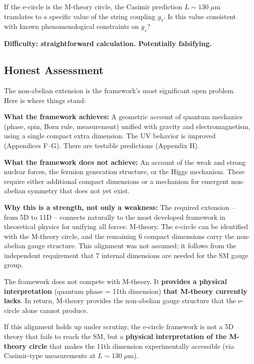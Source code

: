 \documentclass[aps,prd,preprint,superscriptaddress,longbibliography,floatfix]{revtex4-2}
\theoremstyle{remark}
\begin{document}
If the e-circle is the M-theory circle, the Casimir prediction $L \sim 130\;\mu\text{m}$ translates to a specific value of the string coupling $g_s$. Is this value consistent with known phenomenological constraints on $g_s$?

\textbf{Difficulty: straightforward calculation. Potentially falsifying.}



\subsection{Honest Assessment}

The non-abelian extension is the framework's most significant open problem. Here is where things stand:

\textbf{What the framework achieves:} A geometric account of quantum mechanics (phase, spin, Born rule, measurement) unified with gravity and electromagnetism, using a single compact extra dimension. The UV behavior is improved (Appendices F--G). There are testable predictions (Appendix H).

\textbf{What the framework does not achieve:} An account of the weak and strong nuclear forces, the fermion generation structure, or the Higgs mechanism. These require either additional compact dimensions or a mechanism for emergent non-abelian symmetry that does not yet exist.

\textbf{Why this is a strength, not only a weakness:} The required extension -- from 5D to 11D -- connects naturally to the most developed framework in theoretical physics for unifying all forces: M-theory. The e-circle can be identified with the M-theory circle, and the remaining 6 compact dimensions carry the non-abelian gauge structure. This alignment was not assumed; it follows from the independent requirement that 7 internal dimensions are needed for the SM gauge group.

The framework does not compete with M-theory. It \textbf{provides a physical interpretation} (quantum phase = 11th dimension) \textbf{that M-theory currently lacks}. In return, M-theory provides the non-abelian gauge structure that the e-circle alone cannot produce.

If this alignment holds up under scrutiny, the e-circle framework is not a 5D theory that fails to reach the SM, but a \textbf{physical interpretation of the M-theory circle} that makes the 11th dimension experimentally accessible (via Casimir-type measurements at $L \sim 130\;\mu\text{m}$).
\end{document}
